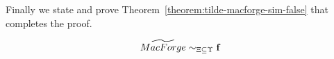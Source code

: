 
Finally we state and prove Theorem~\ref{theorem:tilde-macforge-sim-false} that completes the proof.

\begin{theorem}\label{theorem:tilde-macforge-sim-false}
\begin{align*}
\widetilde{MacForge}\sim_{\Xi\subseteq\Upsilon} \mathbf{f}
\end{align*}
\end{theorem}

